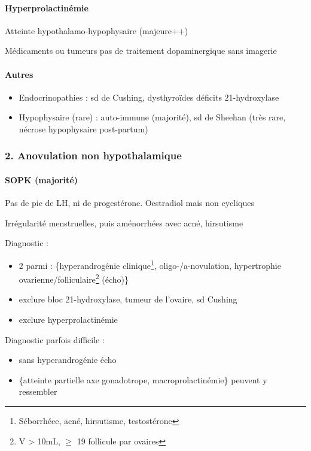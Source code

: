 \documentclass{book}
\begin{document}
\paragraph{Hyperprolactinémie}
\label{sec:org6d63ed0}
Atteinte hypothalamo-hypophysaire (majeure++)

Médicaments ou tumeurs \thus pas de traitement dopaminergique sans imagerie \danger

\paragraph{Autres}
\label{sec:org54de618}
\begin{itemize}
\item Endocrinopathies : sd de Cushing, dysthyroïdes déficits 21-hydroxylase
\item Hypophysaire (rare) : auto-immune (majorité), sd de Sheehan (très rare, nécrose hypophysaire post-partum)
\end{itemize}

\subsubsection{2. Anovulation non hypothalamique}
\label{sec:org37cd004}
\paragraph{SOPK (majorité)}
\label{sec:org1b73cf6}
Pas de pic de LH, ni de progestérone. Oestradiol mais non cycliques

Irrégularité menstruelles, puis aménorrhées avec acné, hirsutisme

Diagnostic :
\begin{itemize}
\item 2 parmi : \{hyperandrogénie clinique\footnote{Séborrhéee, acné, hirsutisme, \inc testostérone}, oligo-/a-novulation, hypertrophie
ovarienne/folliculaire\footnote{V > 10mL, \(\ge\) 19 follicule par ovaires} (écho)\}
\item exclure bloc 21-hydroxylase, tumeur de l'ovaire, sd Cushing
\item exclure hyperprolactinémie
\end{itemize}

Diagnostic parfois difficile :
\begin{itemize}
\item sans hyperandrogénie \thus écho
\item \{atteinte partielle axe gonadotrope, macroprolactinémie\} peuvent y ressembler
\end{itemize}
\end{document}

